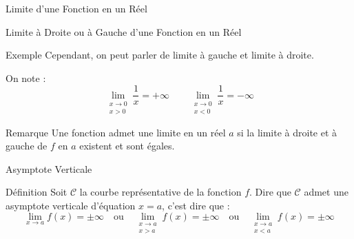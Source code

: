 \documentclass{coursbook}
\begin{document}
\begin{Gpartie}{Limite d'une Fonction en un Réel}
\begin{Spartie}{Limite à Droite ou à Gauche d'une Fonction en un Réel}
\begin{SSpartie}{Exemple}
                Cependant, on peut parler de limite à gauche et limite à droite.

                On note : \[\lim\limits_{\substack{x\to 0 \\ x>0}}\frac{1}{x}=+\infty\qquad\lim\limits_{\substack{x\to 0 \\ x<0}}\frac{1}{x}=-\infty\]
            \end{SSpartie}
            \begin{SSpartie}{Remarque} 
                Une fonction admet une limite en un réel $a$ si la limite à droite et à gauche de $f$ en $a$ existent et sont égales.
            \end{SSpartie}
        \end{Spartie}
        \begin{Spartie}{Asymptote Verticale} 
            \begin{SSpartie}{Définition} 
                Soit $\mathcal{C}$ la courbe représentative de la fonction $f$. Dire que $\mathcal{C}$ admet une asymptote verticale d'équation $x=a$, c'est dire que : \[\lim\limits_{x\to a}f(x)=\pm\infty\quad\text{ou}\quad\lim\limits_{\substack{x\to a \\ x>a}}f(x)=\pm\infty\quad\text{ou}\quad\lim\limits_{\substack{x\to a \\ x<a}}f(x)=\pm\infty\]
            \end{SSpartie}
        \end{Spartie}
    \end{Gpartie}
    \vfill
    \pagebreak
\end{document}
